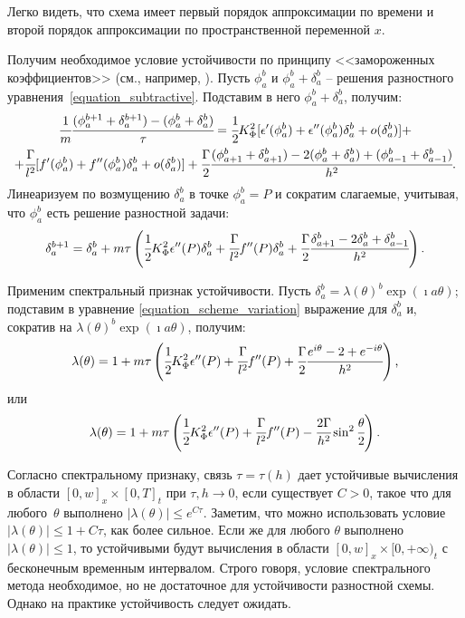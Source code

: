 \documentclass[a4paper,12pt]{article}
\theoremstyle{plain}
\theoremstyle{definition}
\begin{document}
Легко видеть, что схема имеет первый порядок аппроксимации по времени и второй порядок аппроксимации по пространственной переменной $x$.

Получим необходимое условие устойчивости по принципу <<замороженных коэффициентов>> (см., например, \cite{bahvalov_computational_methods}). Пусть $\phi_a^b$ и $\phi_a^b + \delta_a^b$ -- решения разностного уравнения~\eqref{equation_subtractive}. Подставим в него $\phi_a^b + \delta_a^b$, получим:
\begin{multline*}
    \cfrac{1}{m} \cfrac{(\phi_a^{b + 1} + \delta_a^{b + 1}) - (\phi_a^b + \delta_a^b)}{\tau} = \cfrac{1}{2} K_\Phi^2 [\epsilon'(\phi_a^b) + \epsilon''(\phi_a^b) \delta_a^b + o(\delta_a^b)] + \\ + \cfrac{\Gamma}{l^2} [f'(\phi_a^b) + f''(\phi_a^b) \delta_a^b + o(\delta_a^b)] + \cfrac{\Gamma}{2} \cfrac{(\phi_{a + 1}^b + \delta_{a + 1}^b) - 2 (\phi_a^b + \delta_a^b) + (\phi_{a - 1}^b + \delta_{a - 1}^b)}{h^2} \text{.}
\end{multline*}
Линеаризуем по возмущению $\delta_a^b$ в точке $\phi_a^b = P$ и сократим слагаемые, учитывая, что $\phi_a^b$ есть решение разностной задачи:
\begin{equation}
    \delta_a^{b + 1} = \delta_a^b + m \tau \left( \cfrac{1}{2} K_\Phi^2 \epsilon''(P) \delta_a^b + \cfrac{\Gamma}{l^2} f''(P) \delta_a^b + \cfrac{\Gamma}{2} \cfrac{\delta_{a + 1}^b - 2 \delta_a^b + \delta_{a - 1}^b}{h^2} \right) \text{.}
    \label{equation_scheme_variation}
\end{equation} 

Применим спектральный признак устойчивости. Пусть $\delta_a^b = \lambda(\theta)^b \exp(\imath a \theta)$; подставим в уравнение \eqref{equation_scheme_variation} выражение для $\delta_a^b$ и, сократив на $\lambda(\theta)^b \exp(\imath a \theta)$, получим:
$$\lambda(\theta) = 1 + m \tau \left( \cfrac{1}{2} K_\Phi^2 \epsilon''(P) + \cfrac{\Gamma}{l^2} f''(P) + \cfrac{\Gamma}{2} \cfrac{e^{i \theta} - 2 + e^{-i \theta}}{h^2} \right) \text{,}$$
или
\begin{equation}
    \lambda(\theta) = 1 + m \tau \left( \cfrac{1}{2} K_\Phi^2 \epsilon''(P) + \cfrac{\Gamma}{l^2} f''(P) - \cfrac{2 \Gamma}{h^2} \sin^2 \cfrac{\theta}{2} \right) \text{.}
    \label{equation_spectral}
\end{equation}

Согласно спектральному признаку, связь $\tau = \tau(h)$ дает устойчивые вычисления в области $[0, w]_x \times [0, T]_t$ при $\tau, h \to 0$, если существует $C > 0$, такое что для любого~$\theta$ выполнено $|\lambda(\theta)| \leqslant e^{C\tau}$. Заметим, что можно использовать условие $|\lambda(\theta)| \leqslant 1 + C\tau$, как более сильное. Если же для любого $\theta$ выполнено $|\lambda(\theta)| \leqslant 1$, то устойчивыми будут вычисления в области $[0, w]_x \times [0, +\infty)_t$ с бесконечным временным интервалом. Строго говоря, условие спектрального метода необходимое, но не достаточное для устойчивости разностной схемы. Однако на практике устойчивость следует ожидать.
\end{document}
